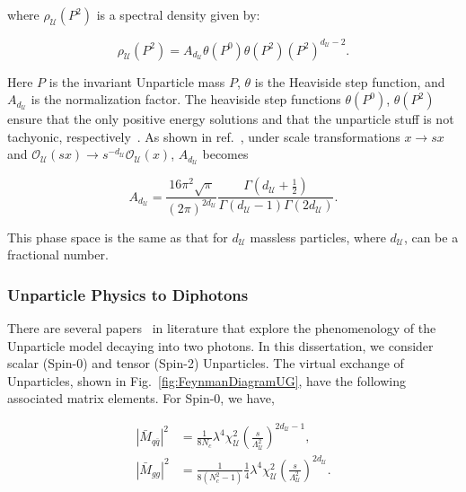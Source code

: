 where $\rho_{\mathcal{U}} (P^2)$ is a spectral density given by:

\begin{equation}
\rho_{\mathcal{U}} (P^2) = A_{d_{\mathcal{U}}} \theta(P^0)\theta(P^2)(P^2)^{d_{\mathcal{U}}-2}.
\end{equation}

Here $P$ is the invariant Unparticle mass $P$, $\theta$ is the Heaviside step function, and $ A_{d_{\mathcal{U}}} $ is the normalization factor. The heaviside step functions $\theta(P^0)$, $\theta(P^2)$ ensure that the only positive energy solutions and that the unparticle stuff is not tachyonic, respectively~\cite{Kenzie:2022nza}. As shown in ref.~\cite{Cheung:2007ap}, under scale transformations $x \rightarrow sx $ and 
$\mathcal{O}_{\mathcal{U}}(sx) \rightarrow s^{-d_{\mathcal{U}}}\mathcal{O}_{\mathcal{U}}(x)$, $ A_{d_{\mathcal{U}}} $ becomes

\begin{equation}
 A_{d_{\mathcal{U}}}= \frac{16\pi^2\sqrt{\pi}}{(2\pi)^{2d_{\mathcal{U}}}} \frac{\Gamma\left(d_{\mathcal{U}} + \frac{1}{2}\right)}{\Gamma\left(d_{\mathcal{U}} -1\right) \Gamma\left(2d_{\mathcal{U}}\right)}.
\end{equation}

This phase space is the same as that for $d_{\mathcal{U}}$ massless particles, where $d_{\mathcal{U}}$, can be a fractional number. 

\subsubsection{Unparticle Physics to Diphotons}

There are several papers~\cite{Kumar:2007af, Kumar:2008dn, Ask:2009pv} in literature that explore the phenomenology of the Unparticle model decaying into two photons. In this dissertation, we consider scalar (Spin-0) and tensor (Spin-2) Unparticles. The virtual exchange of Unparticles, shown in Fig.~\ref{fig:FeynmanDiagramUG}, have the following associated matrix elements. For Spin-0, we have,


\begin{align*}
     |\bar{M}_{q\bar{q}}|^2 &= \frac{1}{8N_c} \lambda^4 \chi^2_{\mathcal{U}} \left(\frac{s}{\Lambda^2_{\mathcal{U}}}\right)^{2d_{\mathcal{U}}-1}, \\
     |\bar{M}_{gg}|^2 &= \frac{1}{8\left(N^2_c-1\right)}\frac{1}{4} \lambda^4 \chi^2_{\mathcal{U}} \left(\frac{s}{\Lambda^2_{\mathcal{U}}}\right)^{2d_{\mathcal{U}}}.
\end{align*}
~\label{eq:Unparspin0Matrix}

